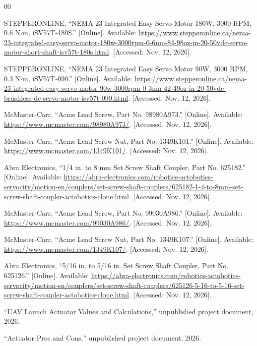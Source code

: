\documentclass[11pt]{article}
\begin{document}
\begin{thebibliography}{00}

STEPPERONLINE, ``NEMA 23 Integrated Easy Servo Motor
180W, 3000 RPM, 0.6 N$\cdot$m, iSV57T-180S.''
[Online]. Available:
\url{https://www.stepperonline.ca/nema-23-integrated-easy-servo-motor-180w-3000rpm-0-6nm-84-98oz-in-20-50vdc-servo-motor-short-shaft-isv57t-180s.html}.
[Accessed: Nov. 12, 2026].

STEPPERONLINE, ``NEMA 23 Integrated Easy Servo Motor
90W, 3000 RPM, 0.3 N$\cdot$m, iSV57T-090.''
[Online]. Available:
\url{https://www.stepperonline.ca/nema-23-integrated-easy-servo-motor-90w-3000rpm-0-3nm-42-49oz-in-20-50vdc-brushless-dc-servo-motor-isv57t-090.html}.
[Accessed: Nov. 12, 2026].


McMaster-Carr, ``Acme Lead Screw, Part No. 98980A973.''
[Online]. Available:
\url{https://www.mcmaster.com/98980A973/}.
[Accessed: Nov. 12, 2026].

McMaster-Carr, ``Acme Lead Screw Nut, Part No. 1349K101.''
[Online]. Available:
\url{https://www.mcmaster.com/1349K101/}.
[Accessed: Nov. 12, 2026].

Abra Electronics, ``1/4 in. to 8 mm Set Screw Shaft Coupler,
Part No. 625182.''
[Online]. Available:
\url{https://abra-electronics.com/robotics-actobotics-servocity/motion-en/couplers/set-screw-shaft-couplers/625182-1-4-to-8mm-set-screw-shaft-coupler-actobotics-clone.html}.
[Accessed: Nov. 12, 2026].

McMaster-Carr, ``Acme Lead Screw, Part No. 99030A986.''
[Online]. Available:
\url{https://www.mcmaster.com/99030A986/}.
[Accessed: Nov. 12, 2026].

McMaster-Carr, ``Acme Lead Screw Nut, Part No. 1349K107.''
[Online]. Available:
\url{https://www.mcmaster.com/1349K107/}.
[Accessed: Nov. 12, 2026].

Abra Electronics, ``5/16 in. to 5/16 in. Set Screw Shaft Coupler,
Part No. 625126.''
[Online]. Available:
\url{https://abra-electronics.com/robotics-actobotics-servocity/motion-en/couplers/set-screw-shaft-couplers/625126-5-16-to-5-16-set-screw-shaft-coupler-actobotics-clone.html}.
[Accessed: Nov. 12, 2026].

``UAV Launch Actuator Values and Calculations,''
unpublished project document, 2026.

``Actuator Pros and Cons,''
unpublished project document, 2026.

\end{thebibliography}
\end{document}
